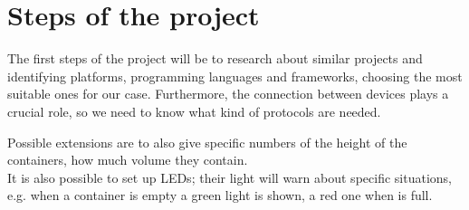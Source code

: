 \documentclass{article}
\begin{document}
\section{Steps of the project}

The first steps of the project will be to research about similar projects and
identifying platforms, programming languages and frameworks, choosing
the most suitable ones for our case.
Furthermore, the connection between devices
plays a crucial role, so we need to know what kind of protocols are needed. \par

Possible extensions are to also give specific numbers of the height of the
containers, how much volume they contain. \\

It is also possible to set up LEDs; their light will warn about specific
situations, e.g. when a container is empty a green light is shown, a red one when
is full.

\begin{comment}

\maketitle
\newpage

\pagenumbering{arabic} %
\tableofcontents %
\newpage

\listoffigures
 
\listoftables

\newpage


\newpage


\newpage


\newpage

\printbibliography


\newpage


\newpage


\newpage

\end{comment}
\end{document}
